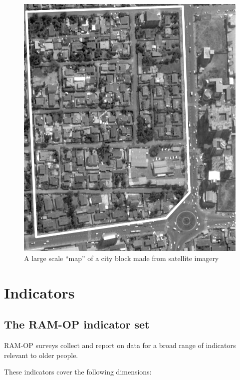 \documentclass[12pt,a4paper]{book}
\theoremstyle{definition}
\theoremstyle{definition}
\theoremstyle{definition}
\theoremstyle{remark}
\begin{document}
\begin{figure}[H]

{\centering \includegraphics[width=800pt]{figures/stage2sample15} 

}

\caption{A large scale “map” of a city block made from satellite imagery}\label{fig:sample29}
\end{figure}

\hypertarget{indicators}{%
\chapter{Indicators}\label{indicators}}

\hypertarget{the-ram-op-indicator-set}{%
\section{The RAM-OP indicator set}\label{the-ram-op-indicator-set}}

RAM-OP surveys collect and report on data for a broad range of
indicators relevant to older people.

These indicators cover the following dimensions:
\end{document}
